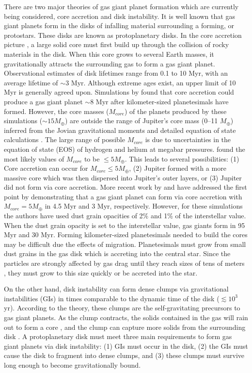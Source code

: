 \documentclass[12pt,preprint2]{aastex}
\begin{document}
There are two major theories of gas giant planet formation which are currently being considered, core accretion and disk
instability. It is well known that gas giant planets form in the disks of infalling material surrounding a forming, or
protostars. These disks are known as protoplanetary disks. In the core accretion picture \citep{mizuno1980}, a large
solid core must first build up through the collision of rocky materials in the disk. When this core grows to several
Earth masses, it gravitationally attracts the surrounding gas to form a gas giant planet. Observational estimates of
disk lifetimes range from 0.1 to 10 Myr, \citep{haisch2001,chen2004} with an average lifetime of $\sim 3$ Myr. Although
extreme ages exist, an upper limit of 10 Myr is generally agreed upon. Simulations by \citet{pollack1996} found that
core accretion could produce a gas giant planet $\sim 8$ Myr after kilometer-sized planetesimals have formed. However,
the core masses ($M_{core}$) of the planets produced by these simulations ($\sim 15 M_{\oplus}$) are outside the range
of Jupiter's core mass (0--11 $M_{\oplus}$) inferred from the Jovian gravitational moments and detailed equation of
state calculations \citep{saumon2004}. The large range of possible $M_{core}$ is due to uncertainties in the equation of
state (EOS) of hydrogen and helium at megabar pressures. \citet{saumon2004} found the most likely values of $M_{core}$
to be $\leq 5 M_{\oplus}$. This leads to several possibilities: (1) Core accretion can occur for $M_{core} \leq 5
M_{\oplus}$, (2) Jupiter formed with a more massive core which was then dispersed into Jupiter's outer layers, or (3)
Jupiter did not form via core accretion. More recent work by \citet{hub2005} and \citet{papa2005} have addressed the
first point by demonstrating that a gas giant planet can form via core accretion with $M_{core}=5 M_{\oplus}$ in 4.5 Myr
and 3 Myr, respectively. However, for these simulations the authors have used dust grain opacities of 2\% and 1\% of the
interstellar value. When the dust grain opacity is set to the interstellar value, gas giants form in 95 Myr and 30
Myr. Forming kilometer-sized planetesimals needed to build the cores may be difficult due the effects of
migration. Planetesimals must grow from small dust grains in the gas disk which is accreting into the central
star. Since the particles are strongly affected by gas drag until they reach sizes of tens of meters \citep{weiden1977},
they must grow to this size quickly or be accreted into the star.

On the other hand, disk instability \citep{kup1951,cam1978,boss1997} can form dense clumps via gravitational
instabilities (GIs) in times comparable to the dynamic time of the disk ($\lesssim 10^3$ yr). According to the theory,
these clumps are the self-gravitating precursors to gas giant planets. As the clump contracts, the solids contained in
the gas will rain out to form a core \citep{slattery1980}, and the clump can capture more solids from the surrounding
disk \citep{helled2006}. A protoplanetary disk must meet three main requirements to form gas giant planets via disk
instability: (1) GIs must occur in the disk, (2) the GIs must cause the disk to fragment into dense clumps, and (3)
these clumps must survive long enough to become gravitationally bound.
\end{document}
